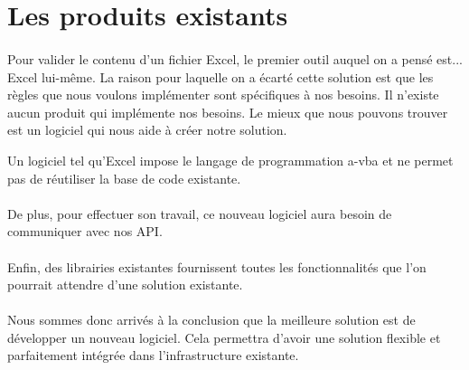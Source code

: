 \section{Les produits existants}
\label{sec:existing-products}

\paragraph{}
Pour valider le contenu d'un fichier Excel, le premier outil auquel on a pensé est... Excel lui-même.
La raison pour laquelle on a écarté cette solution est que les règles que nous voulons implémenter sont spécifiques à nos besoins.
Il n'existe aucun produit qui implémente nos besoins.
Le mieux que nous pouvons trouver est un logiciel qui nous aide à créer notre solution.

Un logiciel tel qu’Excel impose le langage de programmation \gls{a-vba} et ne permet pas de réutiliser la base de code existante.

\paragraph{}
De plus, pour effectuer son travail, ce nouveau logiciel aura besoin de communiquer avec nos API.

\paragraph{}
Enfin, des librairies existantes fournissent toutes les fonctionnalités que l'on pourrait attendre d'une solution existante.

\paragraph{}
Nous sommes donc arrivés à la conclusion que la meilleure solution est de développer un nouveau logiciel.
Cela permettra d'avoir une solution flexible et parfaitement intégrée dans l'infrastructure existante.
